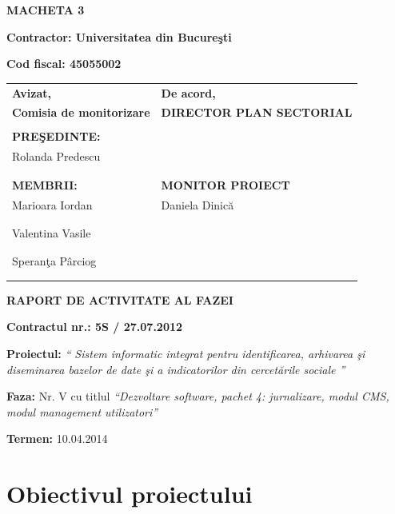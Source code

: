 \documentclass[a4paper, 10pt]{article}
\title{}
\author{}
\date{2013-04-08}
\begin{document}
{\raggedleft\bfseries
MACHETA 3
\par}

{\bfseries
Contractor: Universitatea din Bucure\c{s}ti}

{\textbf{Cod fiscal: 45055002}

\bigskip


\begin{tabular}{@{}l l}
\textbf{Avizat,}&\textbf{De acord,}\\
\textbf{Comisia de monitorizare}&\textbf{DIRECTOR PLAN SECTORIAL}\\
\\
\textbf{PRE\c{S}EDINTE:}&\\
Rolanda Predescu&\\
\\
\\
\textbf{MEMBRII:}&\textbf{MONITOR PROIECT}\\
Marioara Iordan&Daniela Dinic\u{a}\\
\\
\\
Valentina Vasile&\\
\\
\\
Speran\c{t}a P\^{a}rciog\\
\\
\\
\end{tabular}

\bigskip

\bigskip

{\centering\bfseries
RAPORT DE ACTIVITATE AL FAZEI
\par}

\bigskip

{\bfseries
Contractul nr.: 5S / 27.07.2012}

{
\textbf{Proiectul: }
\textit{`` Sistem informatic integrat pentru identificarea, arhivarea \c{s}i diseminarea bazelor de date \c{s}i a indicatorilor din
cercet\u{a}rile sociale ''}}

{
\textbf{Faza: }
Nr. V cu titlul
\textit{``Dezvoltare software, pachet 4: jurnalizare, modul CMS, modul management utilizatori''}}

{\textbf{Termen:} 10.04.2014}

\medskip

\section{Obiectivul proiectului}

}
\end{document}
